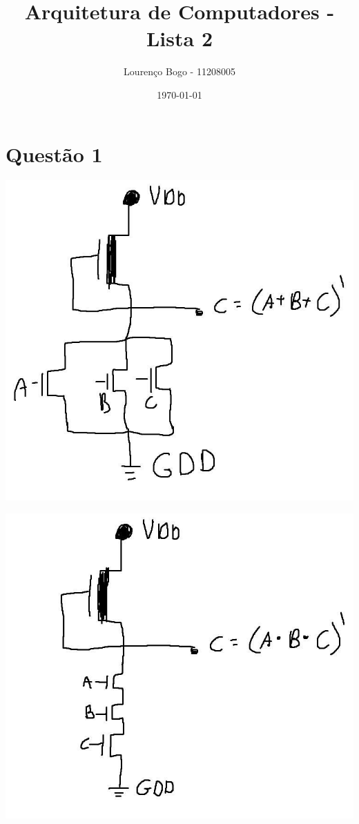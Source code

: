 \documentclass[11pt]{article}
\author{Lourenço Bogo - 11208005}
\date{\today}
\title{Arquitetura de Computadores - Lista 2}
\begin{document}
\maketitle

\section{Questão 1}
\label{sec:org06ba399}
\begin{center}
\includegraphics[width=.9\linewidth]{tripleNor.jpg}
\end{center}
\begin{center}
\includegraphics[width=.9\linewidth]{tripleNand.jpg}
\end{center}
\end{document}
